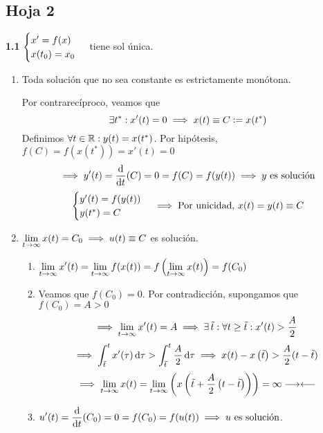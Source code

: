 \subsection{Hoja 2}

\textbf{1.1} $\displaystyle \begin{cases}
		x' = f(x) \\
		x(t_0) = x_0
	\end{cases}$ tiene sol única.
\begin{enumerate}
	\item Toda solución que no sea constante es estrictamente monótona.
	      \begin{dem}
		      Por contrarecíproco, veamos que
		      \[\displaystyle \exists t^* : x'(t)=0 \implies x(t)\equiv C\vcentcolon= x(t^*)\]
		      Definimos $\forall t \in \mathbb{R}:y(t)=x(t^*)$. Por hipótesis, $f(C)=f(x(t^*))=x'(t)=0$
		      \[\implies y'(t)=\odv{}{t}(C)=0=f(C)=f(y(t))\implies y \tex{ es solución}\]
		      \[\begin{cases}
				      y'(t)=f(y(t)) \\
				      y(t^*)=C
			      \end{cases} \implies \text{Por unicidad, } x(t)=y(t)\equiv C\]
	      \end{dem}
	\item $\displaystyle \lim_{t\to \infty} x(t) = C_0 \implies u(t) \equiv C$ es solución.
	      \begin{dem}
		      \begin{enumerate}
			      \item $\displaystyle \lim_{t\to \infty} x'(t)=\lim_{t\to \infty}f(x(t)) = f\left(\lim_{t\to \infty} x(t)\right) = f(C_0)$
			      \item Veamos que $f(C_0)=0$. Por contradicción, supongamos que $f(C_0)=A>0$
			            \[\implies \lim_{t\to \infty} x'(t)=A \implies \exists \, \tilde{t} : \forall t \geq \tilde{t} : x'(t)>\frac{A}{2}\]
			            \[\implies \int_{\til{t}}^{t} x'(\tau) \odif{\tau} > \int_{\til{t}}^{t} \frac{A}{2} \odif{\tau} \implies x(t)-x\left(\til{t}\right)> \frac{A}{2}(t-\til{t})\]
			            \[\implies \lim_{t\to\infty} x(t) = \lim_{t\to\infty}\left(x\left(\tilde{t}+\frac{A}{2}\left(t-\tilde{t}\right)\right)\right)=\infty \longrightarrow\longleftarrow\]
			      \item $\ds u'(t) = \odv{}{t}(C_0)=0=f(C_0)=f(u(t)) \implies u \tex{ es solución}$.
		      \end{enumerate}
	      \end{dem}
\end{enumerate}

